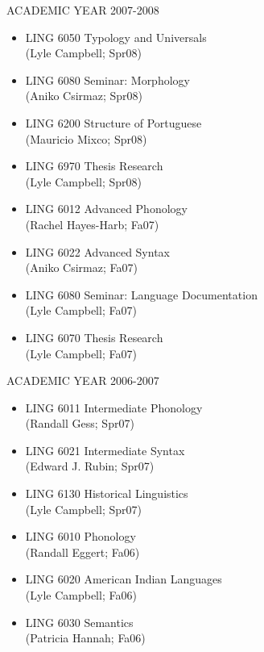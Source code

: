 \documentclass[11pt,twosided]{article}
\theoremstyle{plain}
\theoremstyle{definition}
\newtheorem{phrase string}{Phrase String}
\begin{document}
\noindent ACADEMIC YEAR 2007-2008
\begin{itemize}
\item LING 6050 Typology and Universals\\
(Lyle Campbell; Spr08)
\item LING 6080 Seminar: Morphology\\
(Aniko Csirmaz; Spr08)
\item LING 6200 Structure of Portuguese\\
(Mauricio Mixco; Spr08)
\item LING 6970 Thesis Research\\
(Lyle Campbell; Spr08)
\item LING 6012 Advanced Phonology\\
(Rachel Hayes-Harb; Fa07)
\item LING 6022 Advanced Syntax\\
(Aniko Csirmaz; Fa07)
\item LING 6080 Seminar: Language Documentation\\
(Lyle Campbell; Fa07)
\item LING 6070 Thesis Research\\
(Lyle Campbell; Fa07)
\end{itemize}


ACADEMIC YEAR 2006-2007
\begin{itemize}
\item LING 6011 Intermediate Phonology\\
(Randall Gess; Spr07)
\item LING 6021 Intermediate Syntax\\
(Edward J. Rubin; Spr07)
\item LING 6130 Historical Linguistics\\
(Lyle Campbell; Spr07)
\item LING 6010 Phonology\\
(Randall Eggert; Fa06)
\item LING 6020 American Indian Languages\\
(Lyle Campbell; Fa06)
\item LING 6030 Semantics\\
(Patricia Hannah; Fa06)
\end{itemize}
\end{document}
